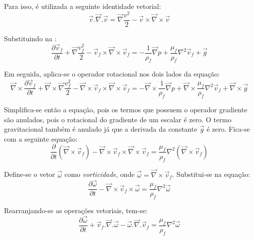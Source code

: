 Para isso, é utilizada a seguinte identidade vetorial:
\begin{equation}
    \vec{v}.\vec{\nabla}.\vec{v} = \vec{\nabla} \dfrac{v^2}{2} - \vec{v}\times\vec{\nabla}\times\vec{v}
    \label{ident_vetor} 
\end{equation}

Substituindo na :
\begin{equation}
	\dfrac{\partial \vec{v}_f}{\partial t} + 
	\vec{\nabla} \dfrac{v^2_f}{2} -
	\vec{v}_f\times\vec{\nabla}\times\vec{v}_f =
    -\dfrac{1}{\rho_f} \vec{\nabla}p +
    \dfrac{\mu_f}{\rho_f} \nabla^2\vec{v}_f +
    \vec{g}
\end{equation}

Em seguida, aplica-se o operador rotacional nos dois lados da equação:
\begin{equation}
	\vec{\nabla}\times\dfrac{\partial \vec{v}_f}{\partial t} + 
	\vec{\nabla}\times\vec{\nabla} \dfrac{v^2_f}{2} -
	\vec{\nabla}\times\vec{v}_f\times\vec{\nabla}\times\vec{v}_f =
    -\vec{\nabla}\times\dfrac{1}{\rho_f} \vec{\nabla}p +
    \vec{\nabla}\times\dfrac{\mu_f}{\rho_f} \nabla^2\vec{v}_f +
    \vec{\nabla}\times\vec{g}
\end{equation}

Simplifica-se então a equação, pois os termos que possuem o operador gradiente são anulados, pois o rotacional do gradiente de um escalar é zero.
O termo gravitacional também é anulado já que a derivada da constante $\vec{g}$ é zero.
Fica-se com a seguinte equação:
\begin{equation}
	\dfrac{\partial}{\partial t}(\vec{\nabla}\times\vec{v}_f)-
	\vec{\nabla}\times\vec{v}_f\times\vec{\nabla}\times\vec{v}_f =
    \dfrac{\mu_f}{\rho_f} \nabla^2 (\vec{\nabla}\times\vec{v}_f)
\end{equation}

Define-se o vetor $\vec{\omega}$ como \textit{vorticidade}, onde $\vec{\omega}=\vec{\nabla}\times\vec{v}_f$.
Substitui-se na equação:
\begin{equation}
	\dfrac{\partial \vec{\omega}}{\partial t} -
	\vec{\nabla}\times\vec{v}_f\times\vec{\omega} =
    \dfrac{\mu_f}{\rho_f} \nabla^2 \vec{\omega}
\end{equation}

Rearranjando-se as operações vetoriais, tem-se:
\begin{equation}
	\dfrac{\partial \vec{\omega}}{\partial t} +
	\vec{v}_f.\vec{\nabla}.\vec{\omega} -
	\vec{\omega}.\vec{\nabla}.\vec{v}_f =
    \dfrac{\mu_f}{\rho_f} \nabla^2 \vec{\omega}
\end{equation}

